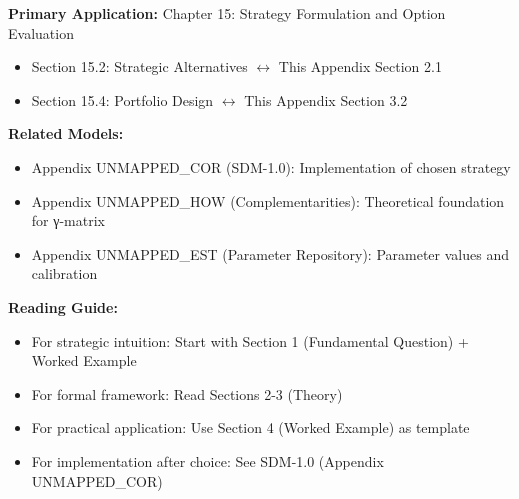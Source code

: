 %
%



\begin{tcolorbox}[colback=purple!5!white, colframe=purple!75!black,
    title=Chapter Linkage: Strategic Option Comparison]

\textbf{Primary Application:} Chapter 15: Strategy Formulation and Option Evaluation
\begin{itemize}[nosep]
\item Section 15.2: Strategic Alternatives $\leftrightarrow$ This Appendix Section 2.1
\item Section 15.4: Portfolio Design $\leftrightarrow$ This Appendix Section 3.2
\end{itemize}

\textbf{Related Models:}
\begin{itemize}[nosep]
\item Appendix UNMAPPED_COR (SDM-1.0): Implementation of chosen strategy
\item Appendix UNMAPPED_HOW (Complementarities): Theoretical foundation for γ-matrix
\item Appendix UNMAPPED_EST (Parameter Repository): Parameter values and calibration
\end{itemize}

\textbf{Reading Guide:}
\begin{itemize}[nosep]
\item For strategic intuition: Start with Section 1 (Fundamental Question) + Worked Example
\item For formal framework: Read Sections 2-3 (Theory)
\item For practical application: Use Section 4 (Worked Example) as template
\item For implementation after choice: See SDM-1.0 (Appendix UNMAPPED_COR)
\end{itemize}

\end{tcolorbox}

